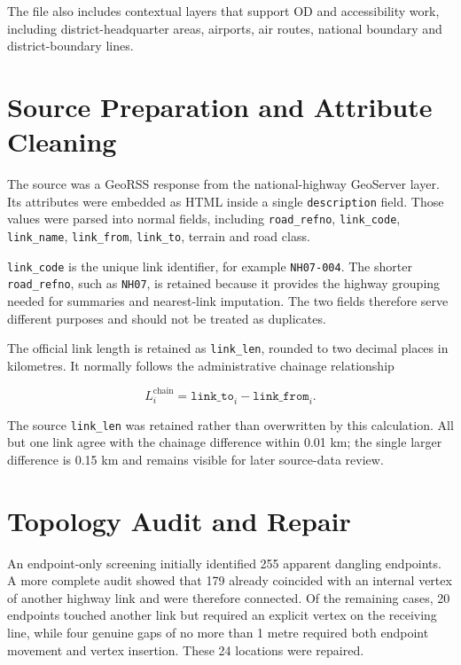 \documentclass[11pt,a4paper]{article}
\begin{document}
The file also includes contextual layers that support OD and accessibility
work, including district-headquarter areas, airports, air routes, national
boundary and district-boundary lines.

\section{Source Preparation and Attribute Cleaning}

The source was a GeoRSS response from the national-highway GeoServer layer. Its
attributes were embedded as HTML inside a single \texttt{description} field.
Those values were parsed into normal fields, including
\texttt{road\_refno}, \texttt{link\_code}, \texttt{link\_name},
\texttt{link\_from}, \texttt{link\_to}, terrain and road class.

\texttt{link\_code} is the unique link identifier, for example
\texttt{NH07-004}. The shorter \texttt{road\_refno}, such as \texttt{NH07}, is
retained because it provides the highway grouping needed for summaries and
nearest-link imputation. The two fields therefore serve different purposes and
should not be treated as duplicates.

The official link length is retained as \texttt{link\_len}, rounded to two
decimal places in kilometres. It normally follows the administrative chainage
relationship

\begin{equation}
L_i^{\mathrm{chain}} = \texttt{link\_to}_i -
\texttt{link\_from}_i.
\label{eq:linklength}
\end{equation}

The source \texttt{link\_len} was retained rather than overwritten by this
calculation. All but one link agree with the chainage difference within
0.01 km; the single larger difference is 0.15 km and remains visible for later
source-data review.

\section{Topology Audit and Repair}

An endpoint-only screening initially identified 255 apparent dangling
endpoints. A more complete audit showed that 179 already coincided with an
internal vertex of another highway link and were therefore connected. Of the
remaining cases, 20 endpoints touched another link but required an explicit
vertex on the receiving line, while four genuine gaps of no more than 1 metre
required both endpoint movement and vertex insertion. These 24 locations were
repaired.
\end{document}
